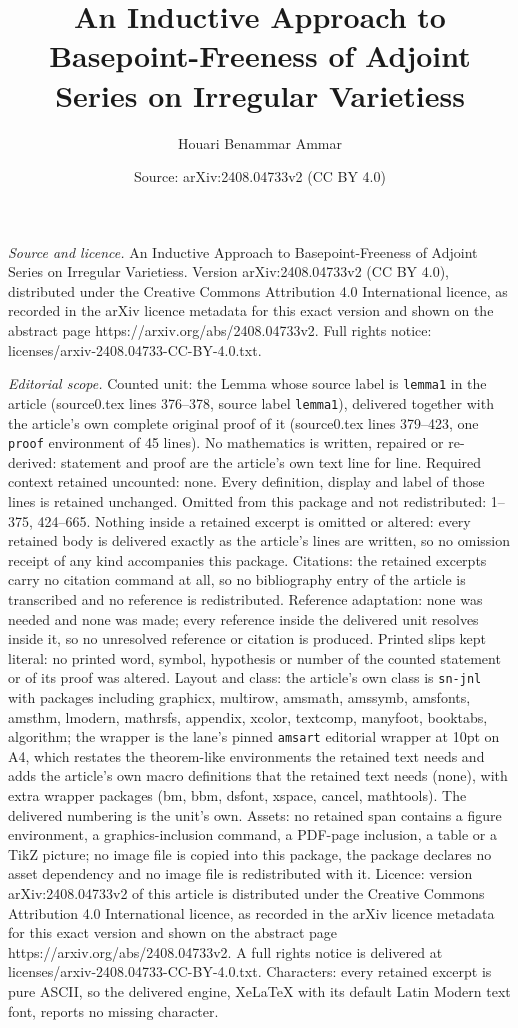 \documentclass[10pt,a4paper]{amsart}
\title[An Inductive Approach to Basepoint-Freeness of Adjoint Serie]{An Inductive Approach to Basepoint-Freeness of Adjoint Series on Irregular Varietiess}
\author{Houari Benammar Ammar}
\date{Source: arXiv:2408.04733v2 (CC BY 4.0)}
\begin{document}
\maketitle

\noindent\emph{Source and licence.} An Inductive Approach to Basepoint-Freeness of Adjoint Series on Irregular Varietiess. Version arXiv:2408.04733v2 (CC BY 4.0), distributed under the Creative Commons Attribution 4.0 International licence, as recorded in the arXiv licence metadata for this exact version and shown on the abstract page https://arxiv.org/abs/2408.04733v2. Full rights notice: licenses/arxiv-2408.04733-CC-BY-4.0.txt.\par\smallskip

\noindent\textit{Editorial scope.} Counted unit: the Lemma whose source label is \texttt{lemma1} in the article (source0.tex lines 376--378, source label \texttt{lemma1}), delivered together with the article's own complete original proof of it (source0.tex lines 379--423, one \texttt{proof} environment of 45 lines). No mathematics is written, repaired or re-derived: statement and proof are the article's own text line for line. Required context retained uncounted: none. Every definition, display and label of those lines is retained unchanged. Omitted from this package and not redistributed: 1--375, 424--665. Nothing inside a retained excerpt is omitted or altered: every retained body is delivered exactly as the article's lines are written, so no omission receipt of any kind accompanies this package. Citations: the retained excerpts carry no citation command at all, so no bibliography entry of the article is transcribed and no reference is redistributed. Reference adaptation: none was needed and none was made; every reference inside the delivered unit resolves inside it, so no unresolved reference or citation is produced. Printed slips kept literal: no printed word, symbol, hypothesis or number of the counted statement or of its proof was altered. Layout and class: the article's own class is \texttt{sn-jnl} with packages including graphicx, multirow, amsmath, amssymb, amsfonts, amsthm, lmodern, mathrsfs, appendix, xcolor, textcomp, manyfoot, booktabs, algorithm; the wrapper is the lane's pinned \texttt{amsart} editorial wrapper at 10pt on A4, which restates the theorem-like environments the retained text needs and adds the article's own macro definitions that the retained text needs (none), with extra wrapper packages (bm, bbm, dsfont, xspace, cancel, mathtools). The delivered numbering is the unit's own. Assets: no retained span contains a figure environment, a graphics-inclusion command, a PDF-page inclusion, a table or a TikZ picture; no image file is copied into this package, the package declares no asset dependency and no image file is redistributed with it. Licence: version arXiv:2408.04733v2 of this article is distributed under the Creative Commons Attribution 4.0 International licence, as recorded in the arXiv licence metadata for this exact version and shown on the abstract page https://arxiv.org/abs/2408.04733v2. A full rights notice is delivered at licenses/arxiv-2408.04733-CC-BY-4.0.txt. Characters: every retained excerpt is pure ASCII, so the delivered engine, XeLaTeX with its default Latin Modern text font, reports no missing character.
\end{document}
